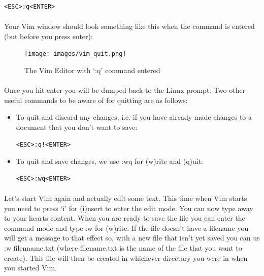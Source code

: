 \documentclass[12pt, a4paper, oneside]{book}
\begin{document}
\begin{lstlisting}[style=DOS]
    <ESC>:q<ENTER>
\end{lstlisting}
\paragraph{} Your Vim window should look something like this when the command is entered (but before you press enter):

\begin{figure}[H]
\centering
\texttt{[image: images/vim\_quit.png]}
\caption{The Vim Editor with `:q' command entered}
\label{fig:vim-quit}
\end{figure}

\paragraph{} Once you hit enter you will be dumped back to the Linux prompt. Two other useful commands to be aware of for quitting are as follows:

\begin{itemize}
\item To quit and discard any changes, i.e. if you have already made changes to a document that you don't want to save:\\
\begin{lstlisting}[style=DOS]
    <ESC>:q!<ENTER>
\end{lstlisting}
\item To quit and save changes, we use :wq for (w)rite and (q)uit:
    \begin{lstlisting}[style=DOS]
    <ESC>:wq<ENTER>
\end{lstlisting}
\end{itemize}

\paragraph{} Let's start Vim again and actually edit some text. This time when Vim starts you need to press `i' for (i)nsert to enter the edit mode. You can now type away to your hearts content. When you are ready to save the file you can enter the command mode and type :w for (w)rite. If the file doesn't have a filename you will get a message to that effect so, with a new file that isn't yet saved you can us :w filenname.txt (where filename.txt is the name of the file that you want to create). This file will then be created in whichever directory you were in when you started Vim.
\end{document}
